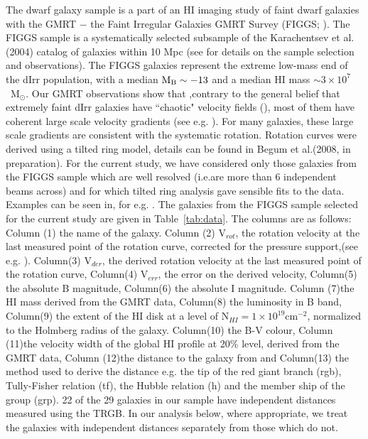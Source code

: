 \documentclass[useAMS,usenatbib]{mn2e}
\begin{document}
The dwarf galaxy sample is a part of an HI imaging study of faint dwarf galaxies with the GMRT $-$ the Faint Irregular Galaxies GMRT Survey (FIGGS; \cite{begum08}). The FIGGS sample is a systematically selected subsample of the Karachentsev et al.(2004) catalog of galaxies within 10 Mpc (see \cite{begum08} for details on the sample selection and observations). The FIGGS galaxies represent the extreme low-mass end of the dIrr population, with a median ${\rm{M_B}} \sim -13$ and a median HI mass $\sim 3 \times 10^7$~M$_\odot$.  Our GMRT observations show that ,contrary to the general belief that extremely faint dIrr galaxies have ``chaotic" velocity fields (\cite{lo93}), most of them have coherent large scale velocity gradients (see e.g. \cite{bc06}). For many galaxies, these 
large scale gradients are consistent with the systematic rotation. 
Rotation curves were derived using a tilted ring model, details can be found in Begum et al.(2008, in preparation). For the current study, we have considered only those galaxies from the FIGGS sample 
which are well resolved (i.e.are more than 6 independent beams across) and for 
which tilted ring analysis gave sensible fits to the data. 
Examples can be seen in, for e.g. \cite{b1,bc04,bc05,bc06}.
The galaxies from the FIGGS sample selected for the current study are given in Table~\ref{tab:data}. The columns are as follows:
Column (1) the name of the galaxy. 
Column (2) V$_{rot}$, the rotation velocity  at the last measured point of the rotation curve, corrected for the pressure support,(see e.g. \citealp{b1,bc04}).
Column(3) V$_{der}$, the derived rotation velocity at the last measured point of the rotation curve, 
Column(4) V$_{err}$, the error on the derived velocity, 
Column(5) the absolute B magnitude, 
Column(6) the absolute I magnitude. 
Column (7)the HI mass derived from the GMRT data,
Column(8) the luminosity in B band, 
Column(9) the extent of the HI disk at a level of N$_{HI}=1\times 10^{19}$cm$^{-2}$, normalized to the Holmberg radius of the galaxy. 
Column(10) the B-V colour, 
Column (11)the velocity width of the global HI profile at 20\% level, derived from the GMRT data, 
Column (12)the distance to the galaxy from  \cite{kk04} and 
Column(13) the method used to derive the distance e.g.  the tip 
of the red giant branch (rgb), Tully-Fisher relation (tf),  the Hubble relation (h) and the member ship of the group (grp). 22 of the 29 galaxies in our sample have independent distances measured using the TRGB. In our analysis below, where appropriate, we treat the galaxies with independent distances separately from those which do not.
\end{document}
